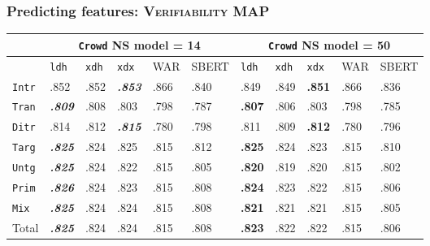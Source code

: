 \documentclass[xcolor={dvipsnames}]{beamer}
\newcommand{\feat}[1]{\textsc{#1}}
\newcommand{\param}[1]{\texttt{#1}}
\begin{document}
\begin{frame}
\frametitle{Predicting features: \feat{Verifiability} MAP}

\small

\begin{table}[htb!]
\begin{center}
\setlength{\tabcolsep}{.35em}
\begin{tabular}{|l||l|l|l||l|l||l|l|l||l|l|}
\hline
 & \multicolumn{5}{c||}{\param{Crowd} NS model = 14} & \multicolumn{5}{c|}{\param{Crowd} NS model = 50} \\
\hline
    		& \param{ldh}	& \param{xdh} &	\param{xdx} & WAR	& {\scriptsize SBERT} & \param{ldh}	& \param{xdh} &	\param{xdx} & WAR	& {\scriptsize SBERT} \\ \hline
\hline
\param{Intr}  & .852                   & .852 & \textit{\textbf{.853}} & .866 & .840 & .849                   & .849          & \textbf{.851} & .866 & .836 \\
\hline
\param{Tran}  & \textit{\textbf{.809}} & .808 & .803                   & .798 & .787 & \textbf{.807}          & .806 & .803          & .798 & .785 \\
\hline
\param{Ditr}  & .814                   & .812 & \textit{\textbf{.815}} & .780 & .798 & .811                   & .809          & \textbf{.812} & .780 & .796 \\
\hline
\hline
\param{Targ}  & \textit{\textbf{.825}} & .824 & .825 & .815 & .812 & \textbf{.825} & .824          & .823          & .815 & .810 \\
\hline
\param{Untg}  & \textit{\textbf{.825}} & .824 & .822                   & .815 & .805 & \textbf{.820}          & .819          & .820 & .815 & .802 \\
\hline
\hline
\param{Prim}  & \textit{\textbf{.826}} & .824 & .823                   & .815 & .808 & \textbf{.824}          & .823          & .822          & .815 & .806 \\
\hline
\param{Mix}   & \textit{\textbf{.825}} & .824 & .824                   & .815 & .808 & \textbf{.821}          & .821 & .821 & .815 & .805 \\
\hline
\hline
Total & \textit{\textbf{.825}} & .824 & .824                   & .815 & .808 & \textbf{.823}          & .822          & .822          & .815 & .806 \\
\hline
\end{tabular}
\end{center}
\end{table}



\end{frame}
\end{document}
